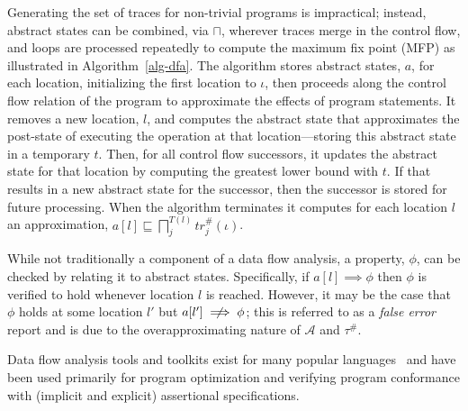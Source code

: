 Generating the set of traces for non-trivial programs is impractical;
instead, abstract states can be combined, via $\sqcap$, wherever
traces merge in the control flow, and loops are processed
repeatedly to compute the maximum fix point (MFP)
as illustrated in Algorithm~\ref{alg-dfa}.
The algorithm stores abstract states, $a$, for each location, initializing
the first location to $\iota$, then proceeds along the control
flow relation of the program to approximate the effects of program
statements.  It removes a new location, $l$, and computes the abstract
state that approximates the post-state of executing the operation
at that location---storing this abstract state in a temporary $t$.  Then, for
all control flow successors, it updates the abstract state for
that location by computing the greatest lower bound with $t$.
If that results in a new abstract state for the successor, then
the successor is stored for future processing.  When the algorithm
terminates it computes for each location $l$ an approximation,
$a[l] \sqsubseteq \displaystyle\bigsqcap_j^{T(l)} tr_j^\#(\iota)$.

While not traditionally a component of a data flow analysis, a property,
$\phi$, can be checked by relating it to abstract states.  Specifically,
if $a[l] \implies \phi$ then $\phi$ is verified to hold whenever 
location $l$ is reached.  However, it may be the case that $\phi$ holds
at some location $l'$ but $a[l'] \centernot\implies \phi$; this is referred
to as a \textit{false error} report and is due to the overapproximating
nature of $\mathcal{A}$ and $\tau^\#$.

Data flow analysis tools and toolkits exist for many popular 
languages~\cite{vallee1999soot,fink2012wala,others}
and have been used primarily for program optimization and
verifying program conformance with (implicit and explicit)
assertional specifications.


